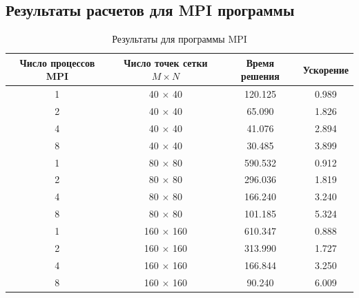 \documentclass[oneside,final,14pt]{extreport}
\begin{document}
\newpage
\subsection{Результаты расчетов для MPI программы}
\begin{table}[ht]
\begin{tabular}{|c|c|c|c|}
\hline
Число процессов MPI & Число точек сетки \(M \times N\) &
Время решения & Ускорение \\
\hline
1 & 40 \(\times\) 40 & 120.125 & 0.989 \\
2 & 40 \(\times\) 40 & 65.090  & 1.826 \\
4 & 40 \(\times\) 40 & 41.076  & 2.894 \\
8 & 40 \(\times\) 40 & 30.485  & 3.899 \\
\hline
1 & 80 \(\times\) 80 & 590.532 & 0.912 \\
2 & 80 \(\times\) 80 & 296.036 & 1.819 \\
4 & 80 \(\times\) 80 & 166.240 & 3.240 \\
8 & 80 \(\times\) 80 & 101.185 & 5.324 \\
\hline
1 & 160 \(\times\) 160 & 610.347 & 0.888 \\
2 & 160 \(\times\) 160 & 313.990 & 1.727 \\
4 & 160 \(\times\) 160 & 166.844 & 3.250 \\
8 & 160 \(\times\) 160 & 90.240  & 6.009 \\
\hline
\end{tabular}
\caption{Результаты для программы MPI}
\label{tab3}
\end{table}
\end{document}

